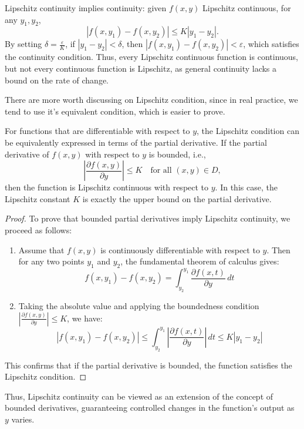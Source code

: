 \documentclass[12pt,a4paper]{article}
\begin{document}
\begin{solution}
\begin{remark}
Lipschitz continuity implies continuity: given \( f(x, y) \) Lipschitz continuous, for any \( y_1, y_2 \),
\[
|f(x, y_1) - f(x, y_2)| \leq K |y_1 - y_2|.
\]
By setting \( \delta = \frac{\varepsilon}{K} \), if \( |y_1 - y_2| < \delta \), then \( |f(x, y_1) - f(x, y_2)| < \varepsilon \), which satisfies the continuity condition. Thus, every Lipschitz continuous function is continuous, but not every continuous function is Lipschitz, as general continuity lacks a bound on the rate of change.

There are more worth discussing on Lipschitz condition, since in real practice, we tend to use it's equivalent condition, which is easier to prove. 
\begin{corollary}
    For functions that are differentiable with respect to \( y \), the Lipschitz condition can be equivalently expressed in terms of the partial derivative. If the partial derivative of \( f(x, y) \) with respect to \( y \) is bounded, i.e.,
\[
\left| \frac{\partial f(x, y)}{\partial y} \right| \leq K \quad \text{for all } (x, y) \in D,
\]
then the function is Lipschitz continuous with respect to \( y \). In this case, the Lipschitz constant \( K \) is exactly the upper bound on the partial derivative.
\end{corollary}
\begin{proof}
To prove that bounded partial derivatives imply Lipschitz continuity, we proceed as follows:

\begin{enumerate}
    \item Assume that \( f(x, y) \) is continuously differentiable with respect to \( y \). Then for any two points \( y_1 \) and \( y_2 \), the fundamental theorem of calculus gives:
\[
f(x, y_1) - f(x, y_2) = \int_{y_2}^{y_1} \frac{\partial f(x, t)}{\partial y} \, dt
\]
    \item Taking the absolute value and applying the boundedness condition \( \left| \frac{\partial f(x, y)}{\partial y} \right| \leq K \), we have:
\[
|f(x, y_1) - f(x, y_2)| \leq \int_{y_2}^{y_1} \left| \frac{\partial f(x, t)}{\partial y} \right| \, dt \leq K |y_1 - y_2|
\]
\end{enumerate}

This confirms that if the partial derivative is bounded, the function satisfies the Lipschitz condition.
\end{proof}
 Thus, Lipschitz continuity can be viewed as an extension of the concept of bounded derivatives, guaranteeing controlled changes in the function's output as \( y \) varies.
\end{remark}
\end{solution}
\end{document}

